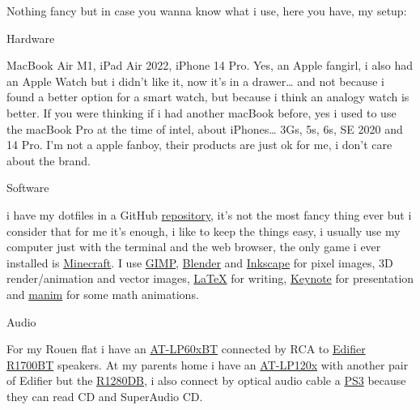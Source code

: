 
Nothing fancy but in case you wanna know what i use, here you have, my setup:

\begin{accordion}{Hardware}

MacBook Air M1, iPad Air 2022, iPhone 14 Pro. Yes, an Apple fangirl, i also had
an Apple Watch but i didn't like it, now it's in a drawer\ldots{} and not
because i found a better option for a smart watch, but because i think an
analogy watch is better. If you were thinking if i had another macBook before,
yes i used to use the macBook Pro at the time of intel, about iPhones\ldots{}
3Gs, 5s, 6s, SE 2020 and 14 Pro. I'm not a apple fanboy, their products are
just ok for me, i don't care about the brand.

\end{accordion}

\begin{accordion}{Software}

i have my dotfiles in a GitHub
\href{https://github.com/vcastor/dotfiles}{repository}, it's not the most fancy
thing ever but i consider that for me it's enough, i like to keep the things
easy, i usually use my computer just with the terminal and the web browser, the
only game i ever installed is
\href{https://www.minecraft.net/en-us}{Minecraft}. I use
\href{https://www.gimp.org}{GIMP}, \href{https://www.blender.org}{Blender} and
\href{https://inkscape.org}{Inkscape} for pixel images, 3D render/animation and
vector images, \href{https://www.latex-project.org}{LaTeX} for writing,
\href{https://www.apple.com/fr/keynote/}{Keynote} for presentation and
\href{https://www.manim.community}{manim} for some math animations.

\end{accordion}

\begin{accordion}{Audio}

For my Rouen flat i have an
\href{https://www.audio-technica.com/fr-fr/at-lp60xbt}{AT-LP60xBT} connected by
RCA to
\href{https://www.edifier.com/global/p/bookshelf-speakers/r1700bt}{Edifier
R1700BT} speakers. At my parents home i have an
\href{https://www.audio-technica.com/fr-fr/at-lp120xusb}{AT-LP120x} with
another pair of Edifier but the
\href{https://www.edifier.com/global/p/bookshelf-speakers/r1280db}{R1280DB}, i
also connect by optical audio cable a
\href{https://en.wikipedia.org/wiki/PlayStation_3}{PS3} because they can read
CD and SuperAudio CD.

\end{accordion}

